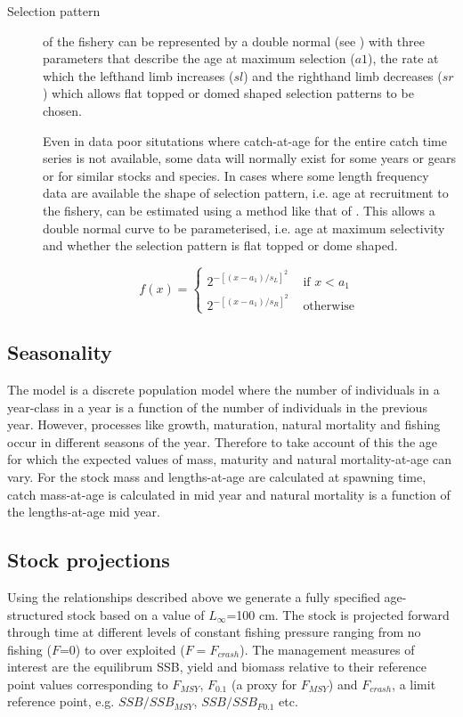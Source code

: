 \documentclass{pnastwo}
\begin{document}
\begin{article}
\begin{description}
\item[Selection pattern] 
of the fishery can be represented by a double normal 
(see \cite{Hilbornetal2000}) with three parameters that describe the age at maximum selection ($a1$), the rate at which the lefthand 
limb increases ($sl$) and the righthand limb decreases ($sr$) which allows flat topped or domed shaped selection patterns to be chosen.

Even in data poor situtations where catch-at-age for the entire catch time series is not available, some data will normally exist for 
some years or gears or for similar stocks and species. In cases where some length frequency data are available the shape of selection pattern, i.e.
age at recruitment to the fishery, can be estimated using a method like that of \cite{wetherall1987estimating}. This allows
a double normal curve to be parameterised, i.e. age at maximum selectivity and whether the selection pattern is flat topped or dome shaped.

\begin{equation}
f(x) = \left\{ \begin{array}{rl}
 2^{-[(x-a_1)/s_L]^2} &\mbox{ if $x<a_1$} \\
 2^{-[(x-a_1)/s_R]^2} &\mbox{ otherwise}
       \end{array} \right.
\end{equation}
 
\end{description}

\subsection{Seasonality}

The model is a discrete population model where the number of individuals in a year-class in a year is a function of the number of individuals in the previous year.
However, processes like growth, maturation, natural mortality and fishing occur in different seasons of the year. Therefore to take account of this the age for which
the expected values of mass, maturity and natural mortality-at-age can vary.
For the stock mass and lengths-at-age are calculated at spawning time, catch mass-at-age is calculated in mid year and natural mortality is a function of the lengths-at-age 
mid year.  

\subsection{Stock projections}
Using the relationships described above we generate a fully specified age-structured stock based on a value of $L_{\infty}$=100 cm. The stock is projected
forward through time at different levels of constant fishing pressure ranging from no fishing ($F$=0) to over exploited ($F=F_{crash}$).
The management measures of interest are the equilibrum SSB, yield and biomass relative to their reference point values corresponding to
$F_{MSY}$, $F_{0.1}$ (a proxy for $F_{MSY}$) and $F_{crash}$, a limit reference point, e.g. $SSB / SSB_{MSY}$, $SSB / SSB_{F0.1}$ etc.


\end{article}
\end{document}
